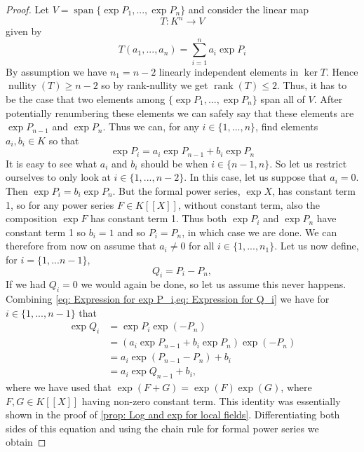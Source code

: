 \documentclass{article}
\DeclareMathOperator{\rank}{rank}
\DeclareMathOperator{\nullity}{nullity}
\newcommand{\Span}{\operatorname{span}}
\numberwithin{equation}{section}
\begin{document}
\begin{proof}
    Let $V = \Span \{ \exp P_1,...,\exp P_n\}$ and consider the linear map $$T : K^n \to V$$ given by
    $$T(a_1, ..., a_n) = \sum_{i=1}^n a_i \exp P_i$$
    By assumption we have $n_1 = n - 2$ linearly independent elements in $\ker T$. Hence $\nullity (T) \geq n-2$ so by rank-nullity we get $\rank (T) \leq 2$. Thus, it has to be the case that two elements among $\{\exp P_1,...,\exp P_n \}$ span all of $V$. After potentially renumbering these elements we can safely say that these elements are $\exp{P_{n-1}}$ and $\exp{P_{n}}$. Thus we can, for any $i \in \{1, ..., n\}$, find elements $a_i, b_i \in K$ so that
    \begin{equation} \label{eq: Expression for exp P_i}
        \exp P_i = a_i \exp P_{n-1} + b_i \exp P_n
    \end{equation}
    It is easy to see what $a_i$ and $b_i$ should be when $i \in \{n-1, n\}$. So let us restrict ourselves to only look at $i \in \{1, ..., n-2\}$. In this case, let us suppose that $a_i = 0$. Then $\exp P_i = b_i \exp P_n$. But the formal power series, $\exp X$, has constant term 1, so for any power series $F \in K[[X]]$, without constant term, also the composition $\exp F$ has constant term 1. Thus both $\exp P_i$ and $\exp P_n$ have constant term 1 so $b_i = 1$ and so $P_i = P_n$, in which case we are done. We can therefore from now on assume that $a_i \neq 0$ for all $i \in \{1, ..., n_1 \}$. Let us now define, for $i = \{1, ... n-1 \}$,
    \begin{equation}\label{eq: Expression for Q_i}
        Q_i = P_i - P_n,
    \end{equation}
    If we had $Q_i = 0$ we would again be done, so let us assume this never happens. Combining \cref{eq: Expression for exp P_i,eq: Expression for Q_i} we have for $i \in  \{1, ..., n-1\}$ that
    \begin{align*}
        \exp Q_i & = \exp P_i \exp (-P_n)                          \\
                 & = (a_i \exp P_{n-1} + b_i \exp P_n) \exp (-P_n) \\
                 & = a_i \exp (P_{n-1} - P_n) + b_i                \\
                 & = a_i \exp Q_{n-1} + b_i,
    \end{align*}
    where we have used that $\exp(F + G) = \exp(F)\exp(G)$, where $F, G \in K[[X]]$ having non-zero constant term. This identity was essentially shown in the proof of \cref{prop: Log and exp for local fields}. Differentiating both sides of this equation and using the chain rule for formal power series we obtain

\end{proof}
\end{document}
